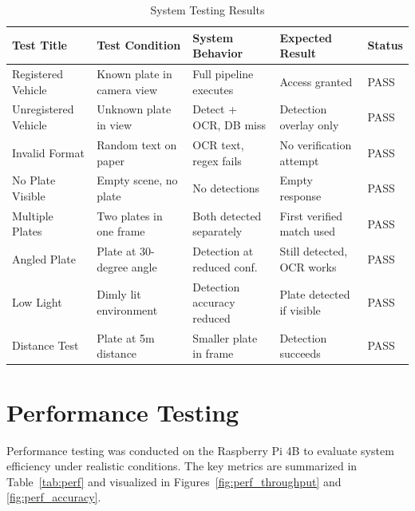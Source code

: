 \documentclass[11pt]{report}
\begin{document}
\begin{table}[H]
\centering
\renewcommand{\arraystretch}{1.4}
\setlength{\tabcolsep}{3pt}
\footnotesize
\begin{tabular}{| m{2.3cm} | m{3.2cm} | m{3.5cm} | m{3.2cm} | m{1.2cm} |}
\hline
\textbf{Test Title} & \textbf{Test Condition} & \textbf{System Behavior} & \textbf{Expected Result} & \textbf{Status} \\
\hline
Registered Vehicle & Known plate in camera view & Full pipeline executes & Access granted & PASS \\
\hline
Unregistered Vehicle & Unknown plate in view & Detect + OCR, DB miss & Detection overlay only & PASS \\
\hline
Invalid Format & Random text on paper & OCR text, regex fails & No verification attempt & PASS \\
\hline
No Plate Visible & Empty scene, no plate & No detections & Empty response & PASS \\
\hline
Multiple Plates & Two plates in one frame & Both detected separately & First verified match used & PASS \\
\hline
Angled Plate & Plate at 30-degree angle & Detection at reduced conf. & Still detected, OCR works & PASS \\
\hline
Low Light & Dimly lit environment & Detection accuracy reduced & Plate detected if visible & PASS \\
\hline
Distance Test & Plate at 5m distance & Smaller plate in frame & Detection succeeds & PASS \\
\hline
\end{tabular}
\caption{System Testing Results}
\end{table}

\section{Performance Testing}

Performance testing was conducted on the Raspberry Pi 4B to evaluate system efficiency under realistic conditions. The key metrics are summarized in Table~\ref{tab:perf} and visualized in Figures~\ref{fig:perf_throughput} and \ref{fig:perf_accuracy}.
\end{document}
